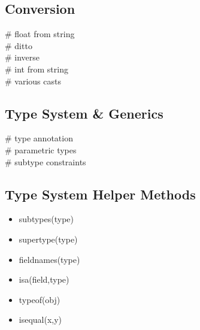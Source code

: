 \subsection*{Conversion}
 \# float from string \\
 \# ditto \\
 \# inverse \\
 \# int from string \\
 \# various casts \\


\subsection*{Type System \& Generics}
 \# type annotation \\
 \# parametric types \\
 \# subtype constraints \\




\subsection*{Type System Helper Methods}
\begin{itemize}
    \item subtypes(type)
    \item supertype(type)
    \item fieldnames(type)
    \item isa(field,type)
    \item typeof(obj)
    \item isequal(x,y)
\end{itemize}
